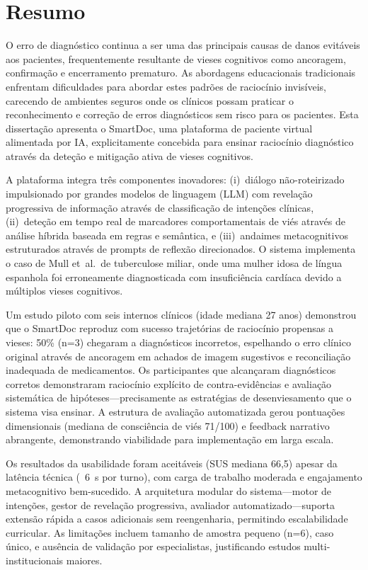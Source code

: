 \chapter*{Resumo}

O erro de diagnóstico continua a ser uma das principais causas de danos evitáveis aos pacientes, frequentemente
resultante de vieses cognitivos como ancoragem, confirmação e encerramento prematuro. As abordagens educacionais
tradicionais enfrentam dificuldades para abordar estes padrões de raciocínio invisíveis, carecendo de ambientes
seguros onde os clínicos possam praticar o reconhecimento e correção de erros diagnósticos sem risco para os
pacientes. Esta dissertação apresenta o SmartDoc, uma plataforma de paciente virtual alimentada por IA,
explicitamente concebida para ensinar raciocínio diagnóstico através da deteção e mitigação ativa de vieses
cognitivos.

A plataforma integra três componentes inovadores: (i)~diálogo não-roteirizado impulsionado por grandes modelos de
linguagem (LLM) com revelação progressiva de informação através de classificação de intenções clínicas,
(ii)~deteção em tempo real de marcadores comportamentais de viés através de análise híbrida baseada em regras e
semântica, e (iii)~andaimes metacognitivos estruturados através de prompts de reflexão direcionados. O sistema
implementa o caso de Mull et~al.\ de tuberculose miliar, onde uma mulher idosa de língua espanhola foi erroneamente
diagnosticada com insuficiência cardíaca devido a múltiplos vieses cognitivos.

Um estudo piloto com seis internos clínicos (idade mediana 27 anos) demonstrou que o SmartDoc reproduz com sucesso
trajetórias de raciocínio propensas a vieses: 50\% (n=3) chegaram a diagnósticos incorretos, espelhando o erro
clínico original através de ancoragem em achados de imagem sugestivos e reconciliação inadequada de medicamentos.
Os participantes que alcançaram diagnósticos corretos demonstraram raciocínio explícito de contra-evidências e
avaliação sistemática de hipóteses—precisamente as estratégias de desenviesamento que o sistema visa ensinar. A
estrutura de avaliação automatizada gerou pontuações dimensionais (mediana de consciência de viés 71/100) e feedback
narrativo abrangente, demonstrando viabilidade para implementação em larga escala.

Os resultados da usabilidade foram aceitáveis (SUS mediana 66,5) apesar da latência técnica (~6~s por turno),
com carga de trabalho moderada e engajamento metacognitivo bem-sucedido. A arquitetura modular do sistema—motor de
intenções, gestor de revelação progressiva, avaliador automatizado—suporta extensão rápida a casos adicionais sem
reengenharia, permitindo escalabilidade curricular. As limitações incluem tamanho de amostra pequeno (n=6), caso
único, e ausência de validação por especialistas, justificando estudos multi-institucionais maiores.

